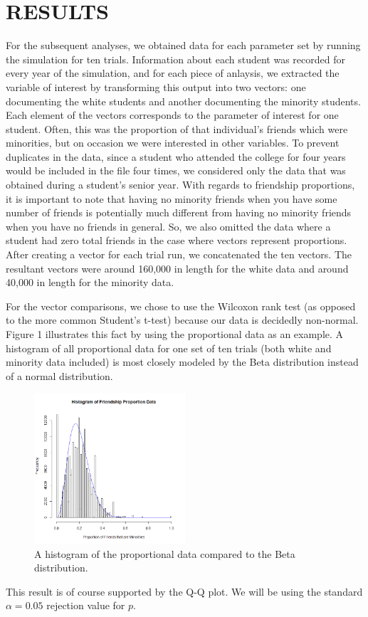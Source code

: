 
\section{RESULTS}
\label{sec:results}

For the subsequent analyses, we obtained data for each parameter set by running the simulation for ten trials. Information about each student was recorded for every year of the 
simulation, and for each piece of anlaysis, we extracted the variable of interest by transforming this output into two vectors: one documenting the white students and another documenting the minority students. Each element of the vectors corresponds to the parameter of interest for one student. Often, this was the proportion of that individual's friends which were 
minorities, but on occasion we were interested in other variables. To prevent duplicates in the data, since a student who attended the college for four years would be included in the file four 
times, we considered only the data that was obtained during a student's senior year. With regards to friendship proportions, it is important to note 
that having no minority friends when you have some number of friends is potentially much different from having no 
minority friends when you have no friends in general. So, we also omitted the data where a student had zero total friends in the case where vectors represent proportions.
After creating a vector for each trial run, we concatenated the ten vectors. The resultant vectors were around 160,000 in 
length for the white data and around 40,000 in length for the minority data.

For the vector comparisons, we chose to use the Wilcoxon rank test (as opposed to the more common Student's t-test) because our data is decidedly non-normal. Figure 1 illustrates this 
fact by using the proportional data as an example. A histogram of all proportional data for one set of ten trials (both white and minority data included) is most closely modeled by the Beta distribution instead of a normal distribution.
\begin{figure}[h]
  \centering
    \includegraphics[width=0.5\textwidth]{histogramProportionData.png}
      \caption{A histogram of the proportional data compared to the Beta distribution.}
\end{figure}
This result is of course supported by the Q-Q plot. We will be using the standard $\alpha=0.05$ rejection value for $p$.

